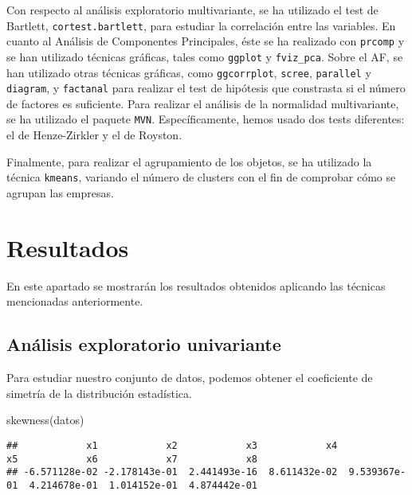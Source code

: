 \documentclass[
]{scrreprt}
\newenvironment{Shaded}{\begin{snugshade}}{\end{snugshade}}
\newcommand{\FunctionTok}[1]{\textcolor[rgb]{0.00,0.00,0.00}{#1}}
\newcommand{\NormalTok}[1]{#1}
\begin{document}
Con respecto al análisis exploratorio multivariante, se ha utilizado el
test de Bartlett, \texttt{cortest.bartlett}, para estudiar la
correlación entre las variables. En cuanto al Análisis de Componentes
Principales, éste se ha realizado con \texttt{prcomp} y se han utilizado
técnicas gráficas, tales como \texttt{ggplot} y \texttt{fviz\_pca}.
Sobre el AF, se han utilizado otras técnicas gráficas, como
\texttt{ggcorrplot}, \texttt{scree}, \texttt{parallel} y
\texttt{diagram}, y \texttt{factanal} para realizar el test de hipótesis
que constrasta si el número de factores es suficiente. Para realizar el
análisis de la normalidad multivariante, se ha utilizado el paquete
\texttt{MVN}. Específicamente, hemos usado dos tests diferentes: el de
Henze-Zirkler y el de Royston.

Finalmente, para realizar el agrupamiento de los objetos, se ha
utilizado la técnica \texttt{kmeans}, variando el número de clusters con
el fin de comprobar cómo se agrupan las empresas.

\hypertarget{resultados}{%
\chapter{Resultados}\label{resultados}}

En este apartado se mostrarán los resultados obtenidos aplicando las
técnicas mencionadas anteriormente.

\hypertarget{anuxe1lisis-exploratorio-univariante}{%
\section{Análisis exploratorio
univariante}\label{anuxe1lisis-exploratorio-univariante}}

Para estudiar nuestro conjunto de datos, podemos obtener el coeficiente
de simetría de la distribución estadística.

\begin{Shaded}
\begin{Highlighting}[]
\FunctionTok{skewness}\NormalTok{(datos)}
\end{Highlighting}
\end{Shaded}

\begin{verbatim}
##            x1            x2            x3            x4            x5            x6            x7            x8 
## -6.571128e-02 -2.178143e-01  2.441493e-16  8.611432e-02  9.539367e-01  4.214678e-01  1.014152e-01  4.874442e-01
\end{verbatim}
\end{document}

